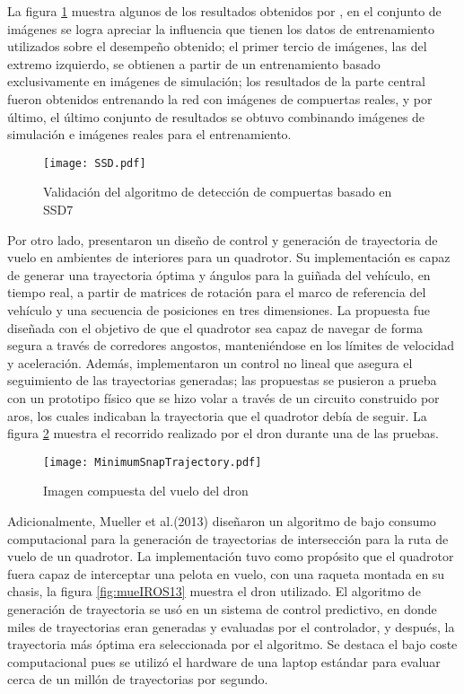 La figura \ref{fig:SSD} muestra algunos de los resultados obtenidos por \citet{cabrera2019gate}, en el conjunto de imágenes se logra apreciar la influencia que tienen los datos de entrenamiento utilizados sobre el desempeño obtenido; el primer tercio de imágenes, las del extremo izquierdo, se obtienen a partir de un entrenamiento basado exclusivamente en imágenes de simulación; los resultados de la parte central fueron obtenidos entrenando la red con imágenes de compuertas reales, y por último, el último conjunto de resultados se obtuvo combinando imágenes de simulación e imágenes reales para el entrenamiento.

\begin{figure}[ht]
    \centering
    \texttt{[image: SSD.pdf]}
    \caption{Validación del algoritmo de detección de compuertas basado en SSD7 \citet{cabrera2019gate}}
    \label{fig:SSD}
\end{figure}

Por otro lado, \citet{mellinger2011minimum} presentaron un diseño de control y generación de trayectoria de vuelo en ambientes de interiores para un quadrotor. Su implementación es capaz de generar una trayectoria óptima y ángulos para la guiñada del vehículo, en tiempo real, a partir de matrices de rotación para el marco de referencia del vehículo y una secuencia de posiciones en tres dimensiones. La propuesta fue diseñada con el objetivo de que el quadrotor sea capaz de navegar de forma segura a través de corredores angostos, manteniéndose en los límites de velocidad y aceleración. Además, implementaron un control no lineal que asegura el seguimiento de las trayectorias generadas; las propuestas se pusieron a prueba con un prototipo físico  que se hizo volar a través de un circuito construido por aros, los cuales indicaban la trayectoria que el quadrotor debía de seguir. La figura \ref{fig:MinimumSnapTrajectory} muestra el recorrido realizado por el dron durante una de las pruebas.

\begin{figure}[ht]
    \centering
    \texttt{[image: MinimumSnapTrajectory.pdf]}
    \caption{Imagen compuesta del vuelo del dron \citet{mellinger2011minimum}}
    \label{fig:MinimumSnapTrajectory}
\end{figure}

Adicionalmente, Mueller et al.(2013)\citet{mueller2013computationally} diseñaron un algoritmo de bajo consumo computacional para la generación de trayectorias de intersección para la ruta de vuelo de un quadrotor. La implementación tuvo como propósito que el quadrotor fuera capaz de interceptar una pelota en vuelo, con una raqueta montada en su chasis, la figura \ref{fig:mueIROS13} muestra el dron utilizado. El algoritmo de generación de trayectoria se usó en un sistema de control predictivo, en donde miles de trayectorias eran generadas y evaluadas por el controlador, y después, la trayectoria más óptima era seleccionada por el algoritmo.  Se destaca el bajo coste computacional pues se utilizó el hardware de una laptop estándar para evaluar cerca de un millón de trayectorias por segundo.

